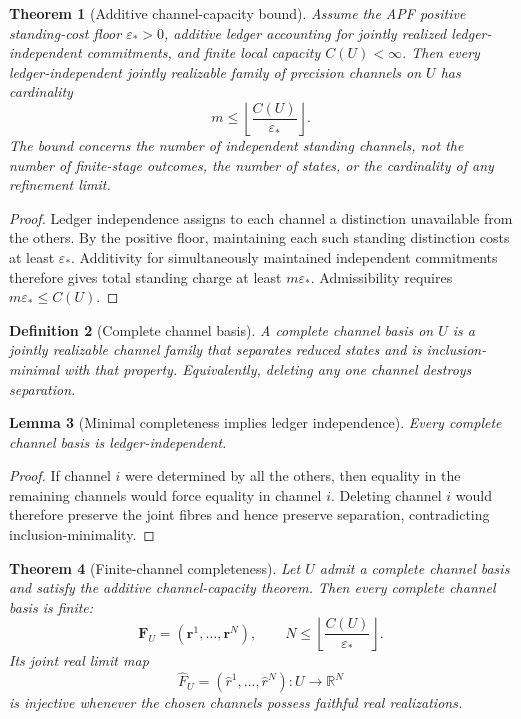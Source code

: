 \documentclass[11pt]{article}
\newtheorem{theorem}{Theorem}[section]
\newtheorem{lemma}[theorem]{Lemma}
\newtheorem{definition}[theorem]{Definition}
\theoremstyle{remark}
\begin{document}
\begin{theorem}[Additive channel-capacity bound]
\label{thm:additive-channel-capacity}
Assume the APF positive standing-cost floor $\varepsilon_*>0$, additive ledger
accounting for jointly realized ledger-independent commitments, and finite
local capacity $C(U)<\infty$.  Then every ledger-independent jointly realizable
family of precision channels on $U$ has cardinality
\[
        m\le \left\lfloor\frac{C(U)}{\varepsilon_*}\right\rfloor.
\]
The bound concerns the number of independent standing channels, not the number
of finite-stage outcomes, the number of states, or the cardinality of any
refinement limit.
\end{theorem}

\begin{proof}
Ledger independence assigns to each channel a distinction unavailable from the
others.  By the positive floor, maintaining each such standing distinction
costs at least $\varepsilon_*$.  Additivity for simultaneously maintained
independent commitments therefore gives total standing charge at least
$m\varepsilon_*$.  Admissibility requires $m\varepsilon_*\le C(U)$.
\end{proof}

\begin{definition}[Complete channel basis]
\label{def:complete-channel-basis}
A \emph{complete channel basis} on $U$ is a jointly realizable channel family
that separates reduced states and is inclusion-minimal with that property.
Equivalently, deleting any one channel destroys separation.
\end{definition}

\begin{lemma}[Minimal completeness implies ledger independence]
\label{lem:minimal-complete-independent}
Every complete channel basis is ledger-independent.
\end{lemma}

\begin{proof}
If channel $i$ were determined by all the others, then equality in the
remaining channels would force equality in channel $i$.  Deleting channel $i$
would therefore preserve the joint fibres and hence preserve separation,
contradicting inclusion-minimality.
\end{proof}

\begin{theorem}[Finite-channel completeness]
\label{thm:finite-channel-completeness}
Let $U$ admit a complete channel basis and satisfy the additive
channel-capacity theorem.  Then every complete channel basis is finite:
\[
        \mathbf F_U=(\mathbf r^1,\ldots,\mathbf r^N),
        \qquad
        N\le\left\lfloor\frac{C(U)}{\varepsilon_*}\right\rfloor.
\]
Its joint real limit map
\[
        \widehat F_U=(\widehat r^1,\ldots,\widehat r^N):U\to\mathbb R^N
\]
is injective whenever the chosen channels possess faithful real realizations.
\end{theorem}
\end{document}
